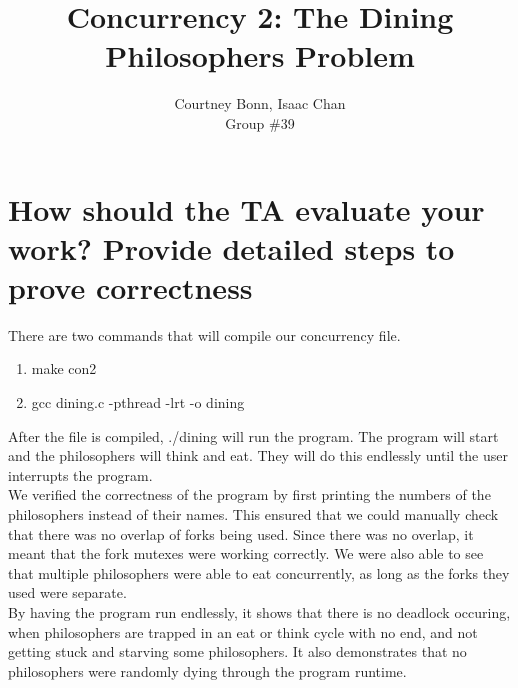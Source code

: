 \documentclass[letterpaper,10pt,draftclsnofoot,onecolumn,titlepage]{IEEEtran}
\def\name{Courtney Bonn, Isaac Chan}
\def\grp{Group \#39}
\begin{document}
\title{Concurrency 2: The Dining Philosophers Problem}
\author{\name \\ \grp}

\maketitle


\section{ How should the TA evaluate your work? Provide detailed steps to prove correctness} 

There are two commands that will compile our concurrency file. 

\begin{enumerate}
	\item make con2
	\item gcc dining.c -pthread -lrt -o dining
\end{enumerate}

After the file is compiled, ./dining will run the program. The program will start and the philosophers will think and eat.
They will do this endlessly until the user interrupts the program. \\

\noindent We verified the correctness of the program by first printing the numbers of the philosophers instead of their names. This ensured that
we could manually check that there was no overlap of forks being used. Since there was no overlap, it meant that the fork mutexes were 
working correctly. We were also able to see that multiple philosophers were able to eat concurrently, as long as the forks they used were separate.\\

\noindent By having the program run endlessly, it shows that there is no deadlock occuring, when philosophers are trapped in an eat or think cycle with
no end, and not getting stuck and starving some philosophers. It also demonstrates that no philosophers were randomly dying through the program runtime. \\
\end{document}
